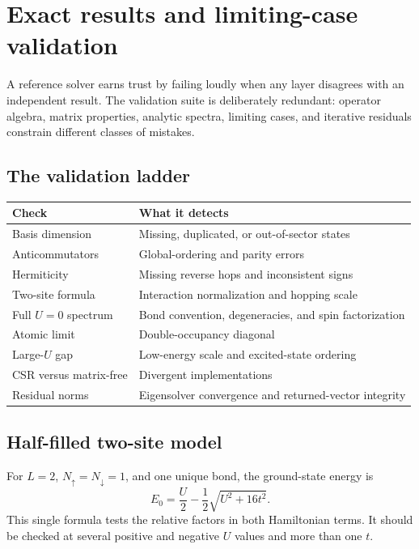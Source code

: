 \chapter{Exact results and limiting-case validation}
\label{chap:validation}

A reference solver earns trust by failing loudly when any layer disagrees with
an independent result.  The validation suite is deliberately redundant:
operator algebra, matrix properties, analytic spectra, limiting cases, and
iterative residuals constrain different classes of mistakes.

\section{The validation ladder}

\begin{center}
\begin{tabular}{p{}p{}}
\toprule
Check & What it detects \\
\midrule
Basis dimension & Missing, duplicated, or out-of-sector states \\
Anticommutators & Global-ordering and parity errors \\
Hermiticity & Missing reverse hops and inconsistent signs \\
Two-site formula & Interaction normalization and hopping scale \\
Full $U=0$ spectrum & Bond convention, degeneracies, and spin factorization \\
Atomic limit & Double-occupancy diagonal \\
Large-$U$ gap & Low-energy scale and excited-state ordering \\
CSR versus matrix-free & Divergent implementations \\
Residual norms & Eigensolver convergence and returned-vector integrity \\
\bottomrule
\end{tabular}
\end{center}

\section{Half-filled two-site model}

For $L=2$, $N_\uparrow=N_\downarrow=1$, and one unique bond, the ground-state
energy is
\begin{equation}
E_0=\frac{U}{2}-\frac{1}{2}\sqrt{U^2+16t^2}.
\label{eq:twosite}
\end{equation}
This single formula tests the relative factors in both Hamiltonian terms.  It
should be checked at several positive and negative $U$ values and more than one
$t$.

